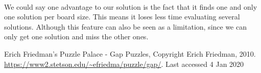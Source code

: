 \documentclass[runningheads]{llncs}
\begin{document}
\paragraph{}
We could say one advantage to our solution is the fact that it finds one and only one solution per board size. This means it loses less time evaluating several solutions.
Although this feature can also be seen as a limitation, since we can only get one solution and miss the other ones.


\begin{thebibliography}{8}
    Erich Friedman's Puzzle Palace - Gap Puzzles, Copyright Erich Friedman, 2010.
    \url{https://www2.stetson.edu/~efriedma/puzzle/gap/}.
    Last accessed 4 Jan 2020
    \end{thebibliography}
\end{document}
